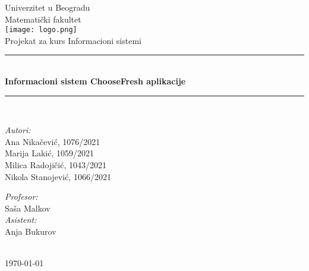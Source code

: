 \begin{titlepage}


\newcommand{\HRule}{\rule{\linewidth}{0.5mm}}
\center
\textup{\Large Univerzitet u Beogradu\\Matemati\v cki fakultet}\\[1.5cm]
\texttt{[image: logo.png]}\\[1cm]
\textup{\Large Projekat za kurs Informacioni sistemi}\\[0.4cm]

\HRule \\[0.4cm]
{ \huge \bfseries Informacioni sistem ChooseFresh aplikacije}\\[0.4cm]
\HRule \\[4.5cm]

\begin{minipage}{0.5\textwidth}
\begin{flushleft}
\large
\emph{Autori:}\\
\textup Ana Nikačević, 1076/2021\\
\textup Marija Lakić, 1059/2021\\
\textup Milica Radojičić, 1043/2021\\
\textup Nikola Stanojević, 1066/2021\\

\end{flushleft}
\end{minipage}
\hfill
\begin{minipage}{0.4\textwidth}
\begin{flushright}
\large
\emph{Profesor:} \\
\textup Saša Malkov\\
\emph{Asistent:} \\
\textup Anja Bukurov\\
\end{flushright}
\end{minipage}\\[2cm]

{\textup \large \today}\\[1cm]

\end{titlepage}
